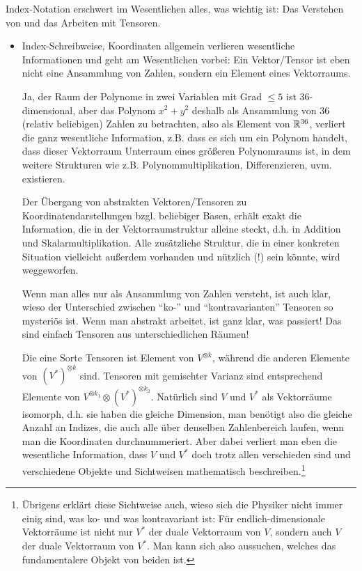 \begin{remark}
Index-Notation erschwert im Wesentlichen alles, was wichtig ist: Das Verstehen von und das Arbeiten mit Tensoren.

\begin{itemize}
\item Index-Schreibweise, Koordinaten allgemein verlieren wesentliche Informationen und geht am Wesentlichen vorbei: Ein Vektor/Tensor ist eben nicht eine Ansammlung von Zahlen, sondern ein Element eines Vektorraums.

Ja, der Raum der Polynome in zwei Variablen mit Grad $\leq 5$ ist 36-dimensional, aber das Polynom $x^2+y^2$ deshalb als Ansammlung von 36 (relativ beliebigen) Zahlen zu betrachten, also als Element von $\mathbb{R}^{36}$, verliert die ganz wesentliche Information, z.B. dass es sich um ein Polynom handelt, dass dieser Vektorraum Unterraum eines größeren Polynomraums ist, in dem weitere Strukturen wie z.B. Polynommultiplikation, Differenzieren, uvm. existieren.

Der Übergang von abstrakten Vektoren/Tensoren zu Koordinatendarstellungen bzgl. beliebiger Basen, erhält exakt die Information, die in der Vektorraumstruktur alleine steckt, d.h. in Addition und Skalarmultiplikation. Alle zusätzliche Struktur, die in einer konkreten Situation vielleicht außerdem vorhanden und nützlich (!) sein könnte, wird weggeworfen.

Wenn man alles nur als Ansammlung von Zahlen versteht, ist auch klar, wieso der Unterschied zwischen \enquote{ko-} und \enquote{kontravarianten} Tensoren so mysteriös ist. Wenn man abstrakt arbeitet, ist ganz klar, was passiert! Das sind einfach Tensoren aus unterschiedlichen Räumen!

Die eine Sorte Tensoren ist Element von $V^{\otimes k}$, während die anderen Elemente von $(V^\ast)^{\otimes k}$ sind. Tensoren mit gemischter Varianz sind entsprechend Elemente von $V^{\otimes k_1}\otimes (V^\ast)^{\otimes k_2}$. Natürlich sind $V$ und $V^\ast$ als Vektorräume isomorph, d.h. sie haben die gleiche Dimension, man benötigt also die gleiche Anzahl an Indizes, die auch alle über denselben Zahlenbereich laufen, wenn man die Koordinaten durchnummeriert. Aber dabei verliert man eben die wesentliche Information, dass $V$ und $V^\ast$ doch trotz allen verschieden sind und verschiedene Objekte und Sichtweisen mathematisch beschreiben.\footnote{Übrigens erklärt diese Sichtweise auch, wieso sich die Physiker nicht immer einig sind, was ko- und was kontravariant ist: Für endlich-dimensionale Vektorräume ist nicht nur $V^\ast$ der duale Vektorraum von $V$, sondern auch $V$ der duale Vektorraum von $V^\ast$. Man kann sich also aussuchen, welches das fundamentalere Objekt von beiden ist.}


\end{itemize}
\end{remark}
